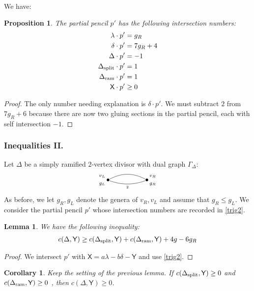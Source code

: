 \documentclass[reqno, 10 pt]{article}
\newtheorem{lem}[thm]{Lemma}
\newtheorem{prop}[thm]{Proposition}
\newtheorem{cor}[thm]{Corollary}
\theoremstyle{definition}
\theoremstyle{remark}
\numberwithin{equation}{section}
\numberwithin{thm}{section}
\numberwithin{prop}{section}
\numberwithin{lem}{section}
\numberwithin{cor}{section}
\numberwithin{conj}{section}
\numberwithin{defn}{section}
\newcommand{\sfY}{{\mathsf Y}}
\newcommand{\sfX}{{\mathsf X}}
\newcommand {\spl}{{\rm split}}
\newcommand {\ram}{{\rm ram}}
\begin{document}
We have:
\begin{prop}\label{trig2}
The partial pencil $p'$ has the following intersection numbers: 
\begin{align*}
\lambda \cdot p' &= g_{R}\\
\delta \cdot p' &= 7g_{R}+4\\
\Delta \cdot p' &= -1\\
\Delta_{\spl} \cdot p' &= 1\\
\Delta_{\ram} \cdot p' &= 1\\
\sfX \cdot p' &\geq 0
\end{align*}
\end{prop}
\begin{proof}
The only number needing explanation is $\delta \cdot p'$.  We must subtract $2$ from $7g_{R}+6$ because there are now two gluing sections in the partial pencil, each with self intersection $-1$.
\end{proof}


\subsubsection{Inequalities II.} Let $\Delta$ be a simply ramified $2$-vertex divisor with dual graph $\Gamma_{\Delta}$: 
\[ \xygraph{
!{<0cm,0cm>;<1cm,0cm>:<0cm,1cm>::}
!{(0,0) }*{\bullet}="l"!{(-.3,.2)}{\scriptstyle v_L}!{(-.3,-.2)}{\scriptstyle g_L}
!{(2,0) }*{\bullet}="r"!{(2.3,.2)}{\scriptstyle v_R}!{(2.3,-.2)}{\scriptstyle g_R}
 "l"-@/^.3cm/"r"  
"l"-@/_.2cm/"r"_{\scriptscriptstyle2}
}  \]
 As before, we let $g_R, g_L$ denote the genera of $v_R, v_L$ and assume that $g_R \leq g_L$. We consider the partial pencil $p'$ whose intersection numbers are recorded in \autoref{trig2}.   

\begin{lem}
We have the following inequality: 
\begin{equation}
 c(\Delta, {\sfY}) \geq c(\Delta_{\spl}, {\sfY}) + c(\Delta_{\ram}, {\sfY}) + 4g-6g_R
 \end{equation}
\end{lem}

\begin{proof}
We intersect $p'$ with $\sfX = a\lambda - b\delta - {\sfY}$ and use \autoref{trig2}.
\end{proof}

\begin{cor}\label{induct2}
Keep the setting of the previous lemma. If $c(\Delta_{\spl}, {\sfY}) \geq 0$ and $c(\Delta_{\ram}, {\sfY}) \geq 0$ , then $c(\Delta, {\sfY}) \geq 0 $.
\end{cor}
\end{document}
